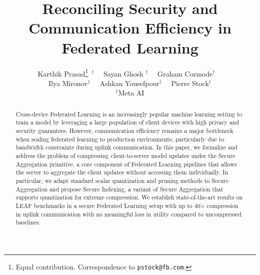 \documentclass[11pt]{article}
\title{Reconciling Security and Communication Efficiency in Federated Learning}
\author{
Karthik Prasad\thanks{Equal contribution. Correspondence to \texttt{pstock@fb.com}.} $^{~\dagger}$~~ Sayan Ghosh\footnotemark[1]$^{~~\dagger}$~~ Graham Cormode$^\dagger$~~ \\ {Ilya Mironov$^\dagger$~~ Ashkan Yousefpour$^\dagger$~~ Pierre Stock$^\dagger$} \\ $^\dagger$Meta AI
}
\newcommand{\karthik}[1]{{\color{blue}Karthik: #1}}
\begin{document}
\maketitle
\begin{abstract}
Cross-device Federated Learning is an increasingly popular machine learning setting to train a model by leveraging
a large population of client devices with high privacy and security guarantees.
However,
communication efficiency remains a major bottleneck when scaling federated learning to production environments, particularly due to bandwidth constraints during uplink communication.
In this paper, we formalize and address the problem of compressing client-to-server model updates
under the Secure Aggregation primitive, a core component of Federated Learning pipelines that allows the server to aggregate the client updates without accessing them individually.
In particular, we adapt standard scalar quantization and pruning methods
to Secure Aggregation and propose Secure Indexing, a variant of Secure Aggregation that supports quantization for extreme compression.
We establish state-of-the-art results on LEAF benchmarks in a secure Federated Learning setup with up to 40$\times$ compression in uplink communication
with no meaningful loss in utility compared to uncompressed baselines.
\end{abstract}













\end{document}
